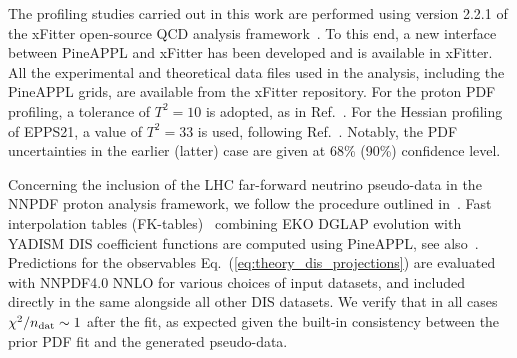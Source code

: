 The profiling studies carried out in this work are performed using version 2.2.1
of the 
{\sc\small xFitter} open-source QCD analysis framework~\cite{Alekhin:2014irh, Bertone:2017tig, xFitter:2022zjb, xFitter:web}.
%
To this end, a new interface between  {\sc\small PineAPPL} and {\sc\small xFitter} has been developed and is available in {\sc\small xFitter}.
%
All the experimental and theoretical data files used in the analysis, including
the  {\sc\small PineAPPL}  grids, are available
from the {\sc\small xFitter} repository.
For the proton PDF profiling, a tolerance of $T^2 = 10$ is adopted, as in Ref.~\cite{PDF4LHCWorkingGroup:2022cjn}. For the Hessian profiling of EPPS21, a value of $T^2 = 33$ is used, following Ref.~\cite{Eskola:2021nhw}. Notably, the PDF uncertainties in the earlier (latter) case are given at 68\% (90\%) confidence level.
%

Concerning the inclusion of the LHC far-forward neutrino pseudo-data
in the NNPDF proton analysis framework, we follow the procedure
outlined in~\cite{NNPDF:2021uiq}.
%
Fast interpolation tables (FK-tables)~\cite{Ball:2010de} combining {\sc\small EKO}
DGLAP evolution with {\sc\small YADISM} DIS coefficient functions
are computed using {\sc\small PineAPPL}, see also~\cite{Barontini:2023vmr}.
%
Predictions for the observables Eq.~(\ref{eq:theory_dis_projections}) are evaluated
with NNPDF4.0 NNLO for various choices of input datasets, and included
directly in the same alongside all other DIS datasets.
%
We verify that in all cases $\chi^2/n_{\rm dat}\sim 1$ after the fit,
as expected given the built-in consistency between the prior PDF fit
and the generated pseudo-data.




